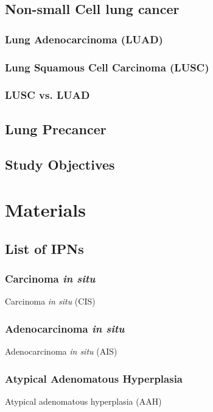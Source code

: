 \documentclass[11pt,a4paper,onecolumn,oneside]{report}
\begin{document}
        \subsection{Non-small Cell lung cancer}

            \subsubsection{Lung Adenocarcinoma (LUAD)}

            \subsubsection{Lung Squamous Cell Carcinoma (LUSC)}

            \subsubsection{LUSC vs. LUAD}

        \subsection{Lung Precancer}

        \subsection{Study Objectives}
    \pagebreak

    \section{Materials}
        \subsection{List of IPNs}
            \subsubsection{Carcinoma \textit{in situ}}
                Carcinoma \textit{in situ} (CIS)

            \subsubsection{Adenocarcinoma \textit{in situ}}
                Adenocarcinoma \textit{in situ} (AIS)

            \subsubsection{Atypical Adenomatous Hyperplasia}
                Atypical adenomatous hyperplasia (AAH)
\end{document}
